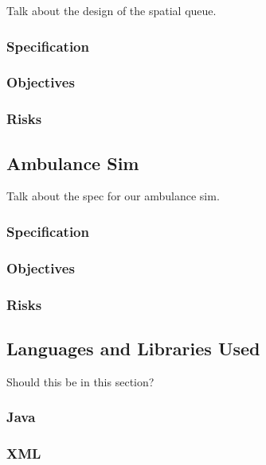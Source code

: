 \documentclass[a4paper]{article}
\begin{document}
Talk about the design of the spatial queue.

\subsubsection{Specification}

\subsubsection{Objectives}

\subsubsection{Risks}

\subsection{Ambulance Sim}%

Talk about the spec for our ambulance sim.

\subsubsection{Specification}

\subsubsection{Objectives}

\subsubsection{Risks}

\subsection{Languages and Libraries Used}%

Should this be in this section?

\subsubsection{Java}

\subsubsection{XML}
\end{document}
